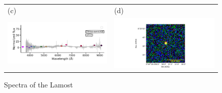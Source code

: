 \documentclass[fleqn,usenatbib]{mnras}
\begin{document}
\begin{figure}
\begin{tabular}{ll}
    (c) & (d) \\
    \includegraphics[trim=10 0 10 20, clip]{Figs/spec-57336-EG034838N001340M01_sp09-025-STRIPE82-0084-014280.pdf} & \includegraphics[width=0.4\linewidth, trim=10 0 10 20, clip]{Figs/STRIPE82-0084-014280_57-0_80_r.pdf} \\
  \end{tabular}
  \caption{Spectra of the Lamost }
  \label{fig:color-diagram}
\end{figure}
\end{document}
